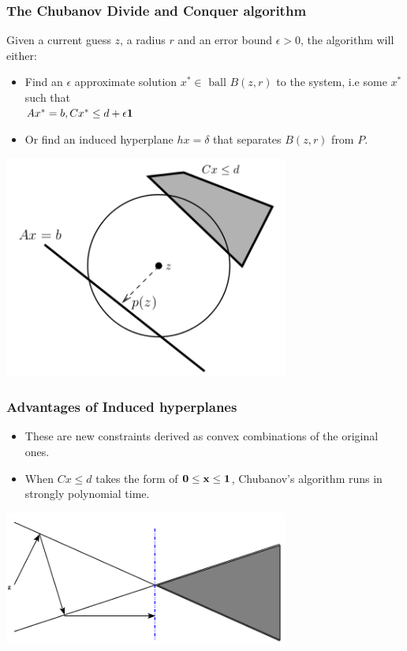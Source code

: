 \documentclass{beamer}
\begin{document}
\begin{frame}
 \frametitle{The Chubanov Divide and Conquer algorithm}
 Given a current guess $z$, a radius $r$ and an error bound $\epsilon > 0$, the algorithm will either:
 \begin{itemize}
  \item Find an $\epsilon$ approximate solution $x^{*} \in \text{ ball }B(z, r)$ to the system, i.e some $x^{*}$ such that \\
	$Ax^{*} = b, Cx^{*} \leq d + \epsilon \bf{1}$ 
  \pause
  \item Or find an induced hyperplane $hx = \delta$ that separates $B(z, r)$ from $P$.
 \end{itemize}
\pause

\includegraphics[width=0.7\textwidth]{fig/ball.png}

 
\end{frame}

\begin{frame}
 \frametitle{Advantages of Induced hyperplanes}
 \begin{itemize}
  \item These are new constraints derived as convex combinations of the original ones.
  \pause
  \item When $Cx \leq d$ takes the form of $\bf{0} \leq x \leq \bf{1}$, Chubanov's algorithm runs in strongly polynomial time.
 \end{itemize}
  \pause
  \includegraphics[width=0.7\textwidth]{fig/dc.png}
 
\end{frame}
\end{document}

